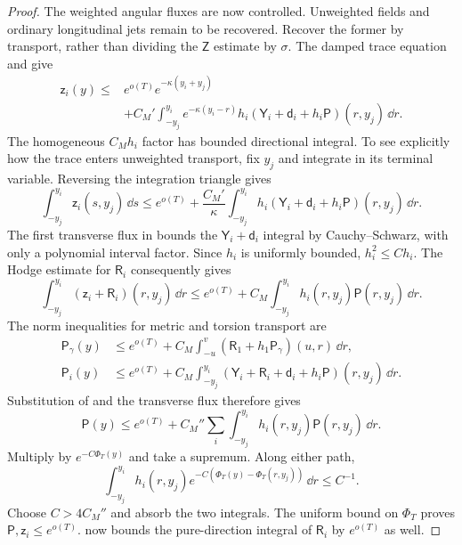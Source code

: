 \begin{proof}
The weighted angular fluxes are now controlled. Unweighted fields and
ordinary longitudinal jets remain to be recovered. Recover the former
by transport, rather than dividing the
$\mathsf Z$ estimate by $\sigma$.  The damped trace equation and
 give
\begin{equation}\label{dn:high-trace-convolution}
\begin{split}
 \mathsf z_i(y)\le{}& e^{o(T)}e^{-\kappa(y_i+y_j)}\\
 &+C_M'\int_{-y_j}^{y_i}e^{-\kappa(y_i-r)}h_i
       (\mathsf Y_i+\mathsf d_i+h_i\mathsf P)(r,y_j)\,\dd r.
\end{split}
\end{equation}
The homogeneous $C_Mh_i$ factor has bounded directional integral.
To see explicitly how the trace enters unweighted transport, fix
$y_j$ and integrate  in its terminal
variable.  Reversing the integration triangle gives
\[
 \int_{-y_j}^{y_i}\mathsf z_i(s,y_j)\,\dd s
 \le e^{o(T)}+\frac{C_M'}{\kappa}
     \int_{-y_j}^{y_i}h_i
       (\mathsf Y_i+\mathsf d_i+h_i\mathsf P)(r,y_j)\,\dd r .
\]
The first transverse flux in  bounds the
$\mathsf Y_i+\mathsf d_i$ integral by Cauchy--Schwarz, with only a
polynomial interval factor.  Since $h_i$ is uniformly bounded,
$h_i^2\le C h_i$.  The Hodge estimate for $\mathsf R_i$ consequently
gives
\begin{equation}\label{dn:high-pure-integrals}
 \int_{-y_j}^{y_i}(\mathsf z_i+\mathsf R_i)(r,y_j)\,\dd r
 \le e^{o(T)}
       +C_M\int_{-y_j}^{y_i}h_i(r,y_j)\mathsf P(r,y_j)\,\dd r .
\end{equation}
The norm inequalities for metric and torsion transport are
\[
\begin{aligned}
 \mathsf P_\gamma(y)
   &\le e^{o(T)}
       +C_M\int_{-u}^{v}(\mathsf R_1+h_1\mathsf P_\gamma)(u,r)\,\dd r,\\
 \mathsf P_i(y)
   &\le e^{o(T)}
       +C_M\int_{-y_j}^{y_i}
          (\mathsf Y_i+\mathsf R_i+\mathsf d_i+h_i\mathsf P)(r,y_j)\,\dd r .
\end{aligned}
\]
Substitution of  and the transverse flux
therefore gives
\begin{equation}\label{dn:high-volterra}
 \mathsf P(y)\le e^{o(T)}+
  C_M''\sum_i\int_{-y_j}^{y_i}h_i(r,y_j)\mathsf P(r,y_j)\,\dd r.
\end{equation}
Multiply by $e^{-C\Phi_T(y)}$ and take a supremum.  Along either path,
\[
 \int_{-y_j}^{y_i}h_i(r,y_j)
 e^{-C(\Phi_T(y)-\Phi_T(r,y_j))}\,\dd r\le C^{-1}.
\]
Choose $C>4C_M''$ and absorb the two integrals.  The uniform bound
on $\Phi_T$ proves $\mathsf P,\mathsf z_i\le e^{o(T)}$.
 now bounds the pure-direction integral
of $\mathsf R_i$ by $e^{o(T)}$ as well.


\end{proof}
